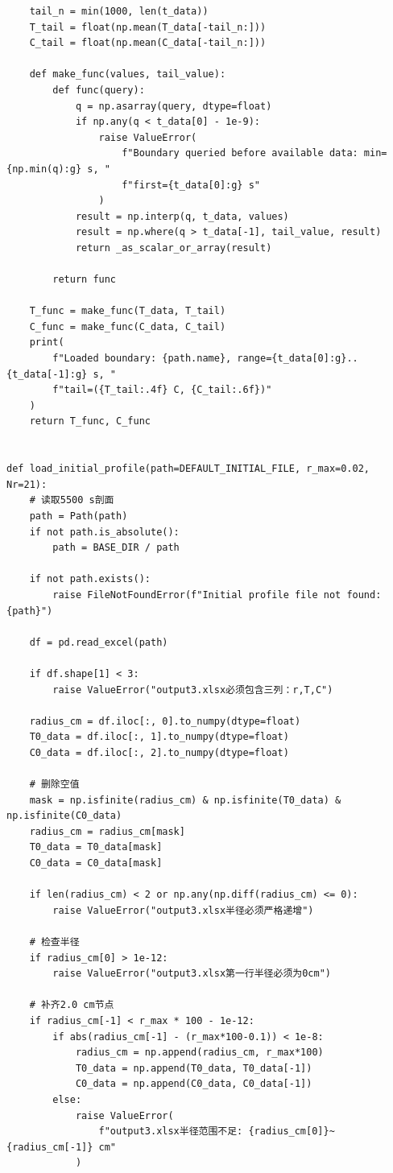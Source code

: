 \documentclass[withoutpreface,bwprint]{cumcm_thesis}
\begin{document}
\begin{appendices}
\begin{lstlisting}
    tail_n = min(1000, len(t_data))
    T_tail = float(np.mean(T_data[-tail_n:]))
    C_tail = float(np.mean(C_data[-tail_n:]))

    def make_func(values, tail_value):
        def func(query):
            q = np.asarray(query, dtype=float)
            if np.any(q < t_data[0] - 1e-9):
                raise ValueError(
                    f"Boundary queried before available data: min={np.min(q):g} s, "
                    f"first={t_data[0]:g} s"
                )
            result = np.interp(q, t_data, values)
            result = np.where(q > t_data[-1], tail_value, result)
            return _as_scalar_or_array(result)

        return func

    T_func = make_func(T_data, T_tail)
    C_func = make_func(C_data, C_tail)
    print(
        f"Loaded boundary: {path.name}, range={t_data[0]:g}..{t_data[-1]:g} s, "
        f"tail=({T_tail:.4f} C, {C_tail:.6f})"
    )
    return T_func, C_func


def load_initial_profile(path=DEFAULT_INITIAL_FILE, r_max=0.02, Nr=21):
    # 读取5500 s剖面
    path = Path(path)
    if not path.is_absolute():
        path = BASE_DIR / path

    if not path.exists():
        raise FileNotFoundError(f"Initial profile file not found: {path}")

    df = pd.read_excel(path)

    if df.shape[1] < 3:
        raise ValueError("output3.xlsx必须包含三列：r,T,C")

    radius_cm = df.iloc[:, 0].to_numpy(dtype=float)
    T0_data = df.iloc[:, 1].to_numpy(dtype=float)
    C0_data = df.iloc[:, 2].to_numpy(dtype=float)

    # 删除空值
    mask = np.isfinite(radius_cm) & np.isfinite(T0_data) & np.isfinite(C0_data)
    radius_cm = radius_cm[mask]
    T0_data = T0_data[mask]
    C0_data = C0_data[mask]

    if len(radius_cm) < 2 or np.any(np.diff(radius_cm) <= 0):
        raise ValueError("output3.xlsx半径必须严格递增")

    # 检查半径
    if radius_cm[0] > 1e-12:
        raise ValueError("output3.xlsx第一行半径必须为0cm")

    # 补齐2.0 cm节点
    if radius_cm[-1] < r_max * 100 - 1e-12:
        if abs(radius_cm[-1] - (r_max*100-0.1)) < 1e-8:
            radius_cm = np.append(radius_cm, r_max*100)
            T0_data = np.append(T0_data, T0_data[-1])
            C0_data = np.append(C0_data, C0_data[-1])
        else:
            raise ValueError(
                f"output3.xlsx半径范围不足: {radius_cm[0]}~{radius_cm[-1]} cm"
            )


\end{lstlisting}
\end{appendices}
\end{document}
